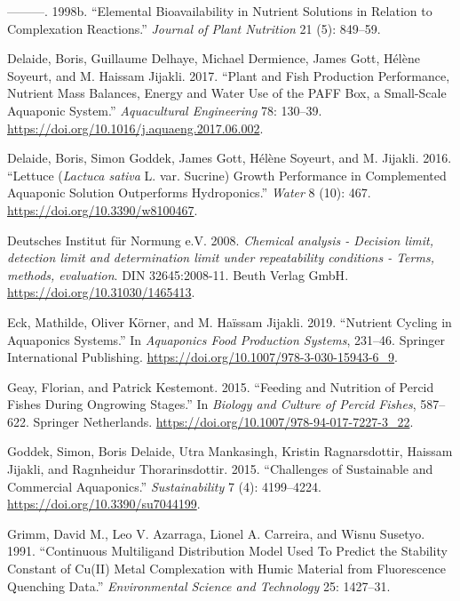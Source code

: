 \documentclass[
]{article}
\newlength{\cslhangindent}
\newlength{\cslentryspacingunit} %
\newenvironment{CSLReferences}[2] %
 {%
  \setlength{\parindent}{0pt}
  \ifodd #1
  \let\oldpar\par
  \def\par{\hangindent=\cslhangindent\oldpar}
  \fi
  \setlength{\parskip}{#2\cslentryspacingunit}
 }%
 {}
\begin{document}
\begin{CSLReferences}{1}{0}
\leavevmode{}%
---------. 1998b. {``Elemental Bioavailability in Nutrient Solutions in Relation to Complexation Reactions.''} \emph{Journal of Plant Nutrition} 21 (5): 849--59.

\leavevmode{}%
Delaide, Boris, Guillaume Delhaye, Michael Dermience, James Gott, Hélène Soyeurt, and M. Haissam Jijakli. 2017. {``Plant and Fish Production Performance, Nutrient Mass Balances, Energy and Water Use of the {PAFF} Box, a Small-Scale Aquaponic System.''} \emph{Aquacultural Engineering} 78: 130--39. \url{https://doi.org/10.1016/j.aquaeng.2017.06.002}.

\leavevmode{}%
Delaide, Boris, Simon Goddek, James Gott, Hélène Soyeurt, and M. Jijakli. 2016. {``{Lettuce (\emph{Lactuca sativa} L. var. Sucrine) Growth Performance in Complemented Aquaponic Solution Outperforms Hydroponics}.''} \emph{Water} 8 (10): 467. \url{https://doi.org/10.3390/w8100467}.

\leavevmode{}%
Deutsches Institut für Normung e.V. 2008. \emph{{Chemical analysis - Decision limit, detection limit and determination limit under repeatability conditions - Terms, methods, evaluation}}. DIN 32645:2008-11. Beuth Verlag {GmbH}. \url{https://doi.org/10.31030/1465413}.

\leavevmode{}%
Eck, Mathilde, Oliver Körner, and M. Haïssam Jijakli. 2019. {``{Nutrient Cycling in Aquaponics Systems}.''} In \emph{Aquaponics Food Production Systems}, 231--46. Springer International Publishing. \url{https://doi.org/10.1007/978-3-030-15943-6_9}.

\leavevmode{}%
Geay, Florian, and Patrick Kestemont. 2015. {``Feeding and Nutrition of Percid Fishes During Ongrowing Stages.''} In \emph{Biology and Culture of Percid Fishes}, 587--622. Springer Netherlands. \url{https://doi.org/10.1007/978-94-017-7227-3_22}.

\leavevmode{}%
Goddek, Simon, Boris Delaide, Utra Mankasingh, Kristin Ragnarsdottir, Haissam Jijakli, and Ragnheidur Thorarinsdottir. 2015. {``{Challenges of Sustainable and Commercial Aquaponics}.''} \emph{Sustainability} 7 (4): 4199--4224. \url{https://doi.org/10.3390/su7044199}.

\leavevmode{}%
Grimm, David M., Leo V. Azarraga, Lionel A. Carreira, and Wisnu Susetyo. 1991. {``{Continuous Multiligand Distribution Model Used To Predict the Stability Constant of Cu(II) Metal Complexation with Humic Material from Fluorescence Quenching Data}.''} \emph{Environmental Science and Technology} 25: 1427--31.


\end{CSLReferences}
\end{document}
